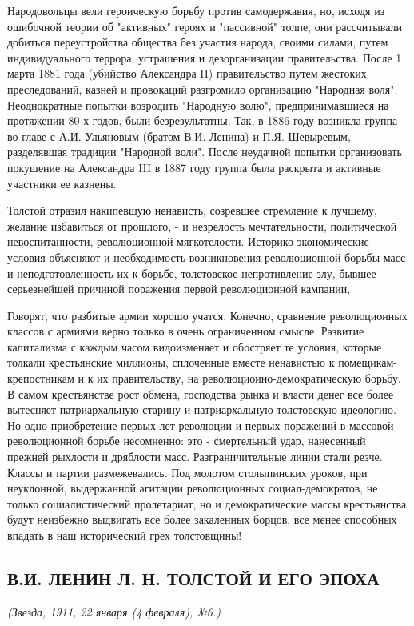 \documentclass[12pt]{article}
\newcommand{\parnum}{(\arabic{parcount})}
\newcounter{parcount}
\newenvironment{parnumbers}{%
  \par%
  \everypar{\noindent \stepcounter{parcount}\marginpar[]{\parnum}}%
}{}
\begin{document}
\begin{parnumbers}
Народовольцы вели героическую борьбу против самодержавия, но, исходя из ошибочной теории об "активных" героях и "пассивной" толпе, они рассчитывали добиться переустройства общества без участия народа, своими силами, путем индивидуального террора, устрашения и дезорганизации правительства. После 1 марта 1881 года (убийство Александра II) правительство путем жестоких преследований, казней и провокаций разгромило организацию "Народная воля". Неоднократные попытки возродить "Народную волю", предпринимавшиеся на протяжении 80-х годов, были безрезультатны. Так, в 1886 году возникла группа во главе с А.И. Ульяновым (братом В.И. Ленина) и П.Я. Шевыревым, разделявшая традиции "Народной воли". После неудачной попытки организовать покушение на Александра III в 1887 году группа была раскрыта и активные участники ее казнены.

Толстой отразил накипевшую ненависть, созревшее стремление к лучшему, желание избавиться от прошлого, - и незрелость мечтательности, политической невоспитанности, революционной мягкотелости. Историко-экономические условия объясняют и необходимость возникновения революционной борьбы масс и неподготовленность их к борьбе, толстовское непротивление злу, бывшее серьезнейшей причиной поражения первой революционной кампании,

Говорят, что разбитые армии хорошо учатся. Конечно, сравнение революционных классов с армиями верно только в очень ограниченном смысле. Развитие капитализма с каждым часом видоизменяет и обостряет те условия, которые толкали крестьянские миллионы, сплоченные вместе ненавистью к помещикам-крепостникам и к их правительству, на революциоино-демократическую борьбу. В самом крестьянстве рост обмена, господства рынка и власти денег все более вытесняет патриархальную старину и патриархальную толстовскую идеологию. Но одно приобретение первых лет революции и первых поражений в массовой революционной борьбе несомненно: это - смертельный удар, нанесенный прежней рыхлости и дряблости масс. Разграничительные линии стали резче. Классы и партии размежевались. Под молотом столыпинских уроков, при неуклонной, выдержанной агитации революционных социал-демократов, не только социалистический пролетариат, но и демократические массы крестьянства будут неизбежно выдвигать все более закаленных борцов, все менее способных впадать в наш исторический грех толстовщины!
\end{parnumbers}
\subsection{В.И. ЛЕНИН Л. Н. ТОЛСТОЙ И ЕГО ЭПОХА}
\textit{(Звезда, 1911, 22 января (4 февраля), №6.)}
\end{document}
